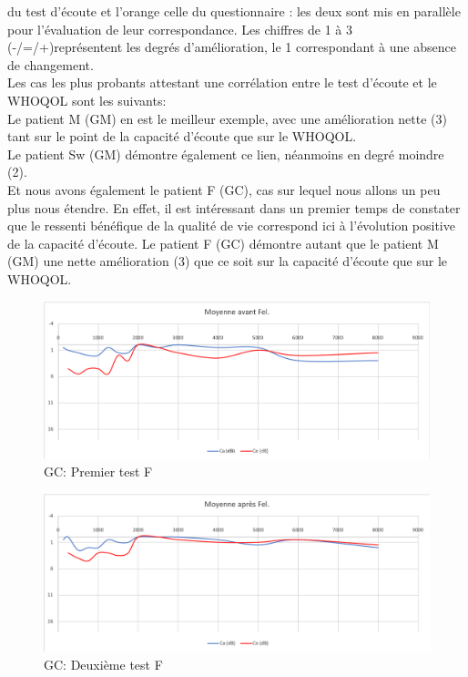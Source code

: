     du test d'écoute et l'orange celle du questionnaire : les deux sont mis en parallèle 
    pour l'évaluation de leur correspondance. Les chiffres de 1 à 3 (-/=/+)représentent les degrés 
    d'amélioration, le 1 
    correspondant à une absence de changement.
    \\ 
    Les cas les plus probants attestant une corrélation entre le test d'écoute et le WHOQOL sont les 
    suivants: 
  \\
  Le patient M (GM) en est le meilleur exemple, avec une amélioration nette (3) tant sur le point 
  de la capacité d'écoute que sur le WHOQOL.
   \\
  Le patient Sw (GM) démontre également ce lien, néanmoins en degré moindre (2).
   \\
Et nous avons également le patient F (GC), cas sur lequel nous allons un peu plus nous étendre.
En effet, il est intéressant dans un premier temps de constater que le ressenti bénéfique de la qualité de 
vie correspond ici à l'évolution positive de la capacité d'écoute. 
Le patient F (GC) démontre autant que  le patient M (GM) une nette amélioration (3) que ce soit sur la 
capacité d'écoute que sur le WHOQOL.
\begin{figure}[th]
	\centering
	\includegraphics[width=0.7\linewidth]{images/graphiques/moyavFEL.png}
	\caption[GC: Patient Fe: 1° test]{GC: Premier test F}
\end{figure}
\begin{figure}[th]
	\centering
	\includegraphics[width=0.7\linewidth]{images/graphiques/moyaprFEL.png}
	\caption[GC: Patient Fe: 2° test]{GC: Deuxième test F}
\end{figure}

